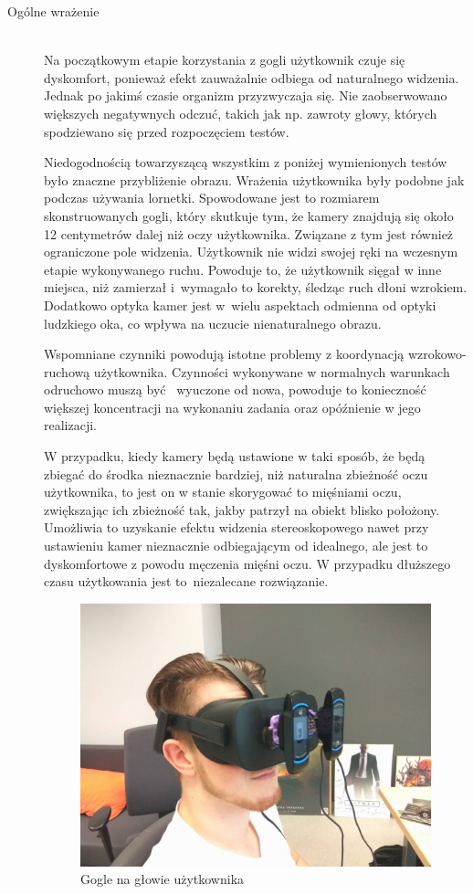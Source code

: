 \documentclass[a4paper,11pt,twoside]{report}
\theoremstyle{definition}
\begin{document}
\begin{description}
\item[Ogólne wrażenie] \hfill \\
Na początkowym etapie korzystania z gogli użytkownik czuje się dyskomfort, ponieważ efekt zauważalnie odbiega od naturalnego widzenia. Jednak po jakimś czasie organizm przyzwyczaja się. Nie zaobserwowano większych negatywnych odczuć, takich jak np. zawroty głowy, których spodziewano się przed rozpoczęciem testów.

Niedogodnością towarzyszącą wszystkim z poniżej wymienionych testów było znaczne przybliżenie obrazu. Wrażenia użytkownika były podobne jak podczas używania lornetki. Spowodowane jest to rozmiarem skonstruowanych gogli, który skutkuje tym, że kamery znajdują się około 12 centymetrów dalej niż oczy użytkownika. Związane z tym jest również ograniczone pole widzenia. Użytkownik nie widzi swojej ręki na wczesnym etapie wykonywanego ruchu. Powoduje to, że użytkownik sięgał w inne miejsca, niż zamierzał i~wymagało to korekty, śledząc ruch dłoni wzrokiem. Dodatkowo optyka kamer jest w~wielu aspektach odmienna od optyki ludzkiego oka, co wpływa na uczucie nienaturalnego obrazu.

Wspomniane czynniki powodują istotne problemy z koordynacją wzrokowo-ruchową użytkownika. Czynności wykonywane w normalnych warunkach odruchowo muszą być ~wyuczone od nowa,  powoduje to konieczność większej koncentracji na wykonaniu zadania oraz opóźnienie w jego realizacji.

W przypadku, kiedy kamery będą ustawione w taki sposób, że będą zbiegać do środka nieznacznie bardziej, niż naturalna zbieżność oczu użytkownika, to jest on w stanie skorygować to mięśniami oczu, zwiększając ich zbieżność tak, jakby patrzył na obiekt blisko położony. Umożliwia to uzyskanie efektu widzenia stereoskopowego nawet przy ustawieniu kamer nieznacznie odbiegającym od idealnego, ale jest to dyskomfortowe z powodu męczenia mięśni oczu. W przypadku dłuższego czasu użytkowania jest to~niezalecane rozwiązanie.

\begin{figure}[H]
\centering
\includegraphics[scale=0.18]{images/googleWithCameras}
\caption[Skonstruowane gogle]{Gogle na głowie użytkownika}
\end{figure}


\end{description}
\end{document}
